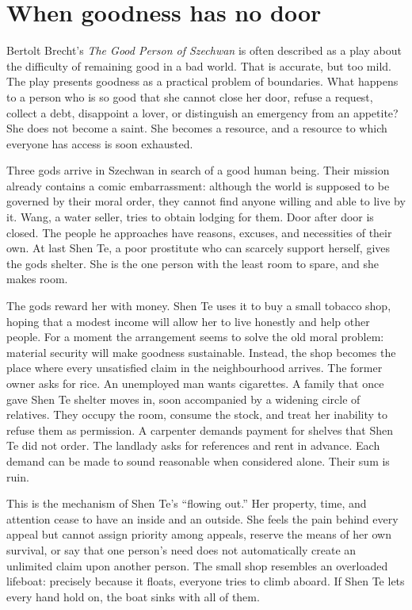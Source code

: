 ﻿\documentclass[12pt,a4paper]{book}
\begin{document}
\section{When goodness has no door}

Bertolt Brecht's \emph{The Good Person of Szechwan} is often described as a
play about the difficulty of remaining good in a bad world.  That is accurate,
but too mild.  The play presents goodness as a practical problem of boundaries.
What happens to a person who is so good that she cannot close her door, refuse
a request, collect a debt, disappoint a lover, or distinguish an emergency
from an appetite?  She does not become a saint.  She becomes a resource, and a
resource to which everyone has access is soon exhausted.

Three gods arrive in Szechwan in search of a good human being.  Their mission
already contains a comic embarrassment: although the world is supposed to be
governed by their moral order, they cannot find anyone willing and able to live
by it.  Wang, a water seller, tries to obtain lodging for them.  Door after door
is closed.  The people he approaches have reasons, excuses, and necessities of
their own.  At last Shen Te, a poor prostitute who can scarcely support
herself, gives the gods shelter.  She is the one person with the least room to
spare, and she makes room.

The gods reward her with money.  Shen Te uses it to buy a small tobacco shop,
hoping that a modest income will allow her to live honestly and help other
people.  For a moment the arrangement seems to solve the old moral problem:
material security will make goodness sustainable.  Instead, the shop becomes
the place where every unsatisfied claim in the neighbourhood arrives.  The
former owner asks for rice.  An unemployed man wants cigarettes.  A family
that once gave Shen Te shelter moves in, soon accompanied by a widening circle
of relatives.  They occupy the room, consume the stock, and treat her inability
to refuse them as permission.  A carpenter demands payment for shelves that
Shen Te did not order.  The landlady asks for references and rent in advance.
Each demand can be made to sound reasonable when considered alone.  Their sum
is ruin.

This is the mechanism of Shen Te's ``flowing out.''  Her property, time, and
attention cease to have an inside and an outside.  She feels the pain behind
every appeal but cannot assign priority among appeals, reserve the means of her
own survival, or say that one person's need does not automatically create an
unlimited claim upon another person.  The small shop resembles an overloaded
lifeboat: precisely because it floats, everyone tries to climb aboard.  If Shen
Te lets every hand hold on, the boat sinks with all of them.
\end{document}
